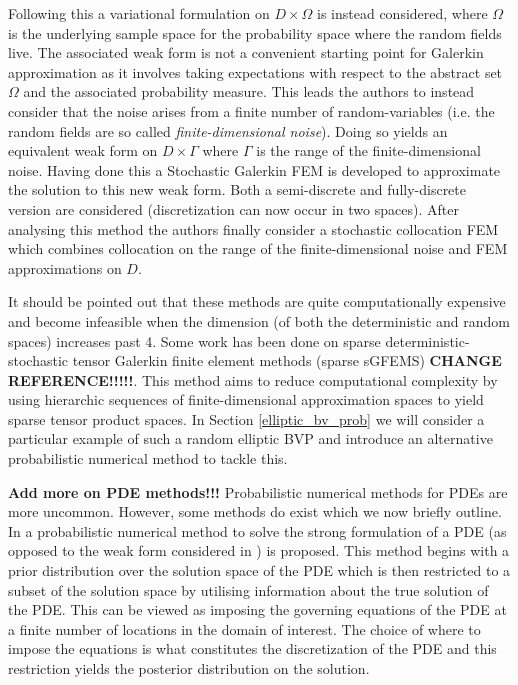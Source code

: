 Following this a variational formulation on $D\times\Omega$ is instead considered, where $\Omega$ is the underlying sample space for the probability space where the random fields live. The associated weak form is not a convenient starting point for Galerkin approximation as it involves taking expectations with respect to the abstract set $\Omega$ and the associated probability measure.
This leads the authors to instead consider that the noise arises from a finite number of random-variables (i.e. the random fields are so called \textit{finite-dimensional noise}). Doing so yields an equivalent weak form on $D\times\Gamma$ where $\Gamma$ is the range of the finite-dimensional noise. Having done this a Stochastic Galerkin FEM is developed to approximate the solution to this new weak form. Both a semi-discrete and fully-discrete version are considered (discretization can now occur in two spaces). After analysing this method the authors finally consider a stochastic collocation FEM which combines collocation on the range of the finite-dimensional noise and FEM approximations on $D$.

It should be pointed out that these methods are quite computationally expensive and become infeasible when the dimension (of both the deterministic and random spaces) increases past 4. Some work has been done on sparse deterministic-stochastic tensor Galerkin finite element methods (sparse sGFEMS) \textcolor{blue}{\citep{bieri2010sparse}} \textbf{CHANGE REFERENCE!!!!!}. This method aims to reduce computational complexity by using hierarchic sequences of finite-dimensional approximation spaces to yield sparse tensor product spaces. In Section \textcolor{blue}{\ref{elliptic_bv_prob}} we will consider a particular example of such a random elliptic BVP and introduce an alternative probabilistic numerical method to tackle this.

\textbf{Add more on PDE methods!!!} Probabilistic numerical methods for PDEs are more uncommon. However, some methods do exist which we now briefly outline. In \textcolor{blue}{\citep{cockayne2016probabilistic}} a probabilistic numerical method to solve the strong formulation of a PDE (as opposed to the weak form considered in \textcolor{blue}{\citep{conrad2017statistical}}) is proposed. This method begins with a prior distribution over the solution space of the PDE which is then restricted to a subset of the solution space by utilising information about the true solution of the PDE. This can be viewed as imposing the governing equations of the PDE at a finite number of locations in the domain of interest. The choice of where to impose the equations is what constitutes the discretization of the PDE and this restriction yields the posterior distribution on the solution.

